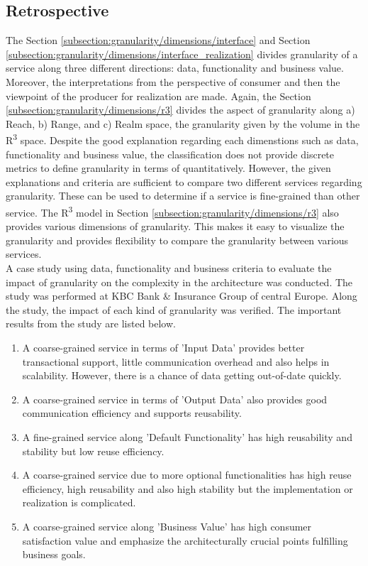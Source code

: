 \subsection{Retrospective}\label{subsection:granularity/dimensions/retrospective}
The Section \ref{subsection:granularity/dimensions/interface} and Section \ref{subsection:granularity/dimensions/interface_realization} divides granularity of a service along three different directions: data, functionality and business value. Moreover, the interpretations from the perspective of consumer and then the viewpoint of the producer for realization are made.
Again, the Section \ref{subsection:granularity/dimensions/r3} divides the aspect of granularity along a) Reach, b) Range, and c) Realm space, the granularity given by the volume in the R\textsuperscript{3} space.
Despite the good explanation regarding each dimenstions such as data, functionality and business value, the classification does not provide discrete metrics to define granularity in terms of quantitatively. However, the given explanations and criteria are sufficient to compare two different services regarding granularity. These can be used to determine if a service is fine-grained than other service.
The R\textsuperscript{3} model in Section \ref{subsection:granularity/dimensions/r3} also provides various dimensions of granularity. This makes it easy to visualize the granularity and provides flexibility to compare the granularity between various services.
\\
A case study \cite{Pierre-Reldin:2007aa} using data, functionality and business criteria to evaluate the impact of granularity on the complexity in the architecture was conducted. The study was performed at KBC Bank & Insurance Group of central Europe. Along the study, the impact of each kind of granularity was verified. The important results from the study are listed below.

\begin{enumerate}
\item A coarse-grained service in terms of 'Input Data' provides better transactional support, little communication overhead and also helps in scalability. However, there is a chance of data getting out-of-date quickly.
\item A coarse-grained service in terms of 'Output Data' also provides good communication efficiency and supports reusability.
\item A fine-grained service along 'Default Functionality' has high reusability and stability but low reuse efficiency.
\item A coarse-grained service due to more optional functionalities has high reuse efficiency, high reusability and also high stability but the implementation or realization is complicated.
\item A coarse-grained service along 'Business Value' has high consumer satisfaction value and emphasize the architecturally crucial points fulfilling business goals.
\end{enumerate}

